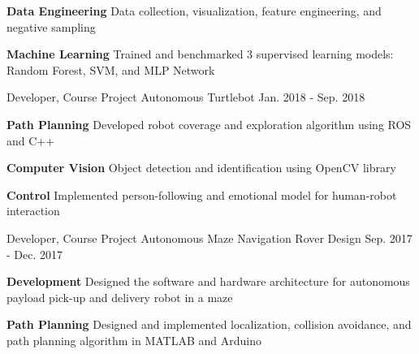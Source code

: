 \begin{cventries}
{\begin{cvitems}
			\item {\textbf{Data Engineering} Data collection, visualization, feature engineering, and negative sampling}
			\item {\textbf{Machine Learning} Trained and benchmarked 3 supervised learning models: Random Forest, SVM, and MLP Network}
		\end{cvitems}
	}
	\cventry
	{Developer, Course Project}
	{Autonomous Turtlebot}
	{Jan. 2018 - Sep. 2018}
	{}
	{
		\begin{cvitems}
			\item {\textbf{Path Planning} Developed robot coverage and exploration algorithm using ROS and C++}
			\item {\textbf{Computer Vision} Object detection and identification using OpenCV library}
			\item {\textbf{Control} Implemented person-following and emotional model for human-robot interaction}
		\end{cvitems}
	}
	\cventry
	{Developer, Course Project}
	{Autonomous Maze Navigation Rover Design}
	{Sep. 2017 - Dec. 2017}
	{}
	{
		\begin{cvitems}
			\item { \textbf{Development} Designed the software and hardware architecture for autonomous payload pick-up and delivery robot in a maze}
			\item { \textbf{Path Planning} Designed and implemented localization, collision avoidance, and path planning algorithm in MATLAB and Arduino}
		\end{cvitems}
	}

\end{cventries}
